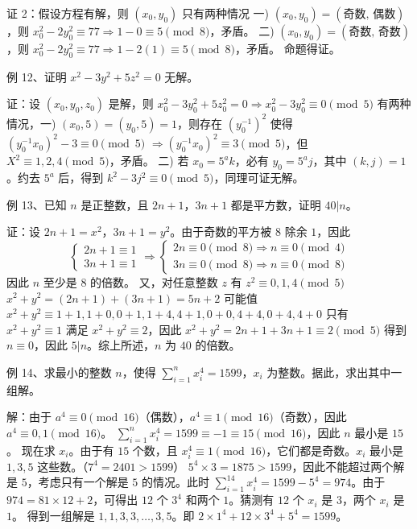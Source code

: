 \begin{questions}
\begin{solution}
证 2：假设方程有解，则 $(x_0, y_0)$ 只有两种情况
一) $(x_0, y_0) = (\text{奇数, 偶数})$，则 $x_0^2 - 2y_0^2 \equiv 77 \Rightarrow 1 - 0 \equiv 5 \pmod 8$，矛盾。
二) $(x_0, y_0) = (\text{奇数, 奇数})$，则 $x_0^2 - 2y_0^2 \equiv 77 \Rightarrow 1 - 2(1) \equiv 5 \pmod 8$，矛盾。
命题得证。
\end{solution}

\question 例 12、证明 $x^2 - 3y^2 + 5z^2 = 0$ 无解。

\begin{solution}
证：设 $(x_0, y_0, z_0)$ 是解，则 $x_0^2 - 3y_0^2 + 5z_0^2 = 0 \Rightarrow x_0^2 - 3y_0^2 \equiv 0 \pmod 5$
有两种情况，一) $(x_0, 5) = (y_0, 5) = 1$，则存在 $(y_0^{-1})^2$ 使得 $(y_0^{-1}x_0)^2 - 3 \equiv 0 \pmod 5$
$\Rightarrow (y_0^{-1}x_0)^2 \equiv 3 \pmod 5$，但 $X^2 \equiv 1, 2, 4 \pmod 5$，矛盾。
二) 若 $x_0 = 5^a k$，必有 $y_0 = 5^a j$，其中 $(k, j) = 1$。约去 $5^a$ 后，得到
$k^2 - 3j^2 \equiv 0 \pmod 5$，同理可证无解。
\end{solution}

\question 例 13、已知 $n$ 是正整数，且 $2n + 1$，$3n + 1$ 都是平方数，证明 $40 | n$。

\begin{solution}
证：设 $2n + 1 = x^2$，$3n + 1 = y^2$。由于奇数的平方被 $8$ 除余 $1$，因此
\[ \begin{cases} 2n + 1 \equiv 1 \\ 3n + 1 \equiv 1 \end{cases} \Rightarrow \begin{cases} 2n \equiv 0 \pmod 8 \Rightarrow n \equiv 0 \pmod 4 \\ 3n \equiv 0 \pmod 8 \Rightarrow n \equiv 0 \pmod 8 \end{cases} \]
因此 $n$ 至少是 $8$ 的倍数。
又，对任意整数 $z$ 有 $z^2 \equiv 0, 1, 4 \pmod 5$
$x^2 + y^2 = (2n + 1) + (3n + 1) = 5n + 2$
可能值 $x^2 + y^2 \equiv 1 + 1, 1 + 0, 0 + 1, 1 + 4, 4 + 1, 0 + 0, 4 + 4, 0 + 4, 4 + 0$
只有 $x^2 + y^2 \equiv 1 \text{ 满足 } x^2 + y^2 \equiv 2$，因此 $x^2 + y^2 = 2n + 1 + 3n + 1 \equiv 2 \pmod 5$
得到 $n \equiv 0$，因此 $5 | n$。综上所述，$n$ 为 $40$ 的倍数。
\end{solution}

\question 例 14、求最小的整数 $n$，使得 $\sum_{i=1}^{n} x_i^4 = 1599$，$x_i$ 为整数。据此，求出其中一组解。

\begin{solution}
解：由于 $a^4 \equiv 0 \pmod{16}$（偶数），$a^4 \equiv 1 \pmod{16}$（奇数），因此 $a^4 \equiv 0, 1 \pmod{16}$。
$\sum_{i=1}^n x_i^4 = 1599 \equiv -1 \equiv 15 \pmod{16}$，因此 $n$ 最小是 $15$。
现在求 $x_i$。由于有 $15$ 个数，且 $x_i^4 \equiv 1 \pmod{16}$，它们都是奇数。$x_i$ 最小是 $1, 3, 5$ 这些数。（$7^4 = 2401 > 1599$）
$5^4 \times 3 = 1875 > 1599$，因此不能超过两个解是 $5$，考虑只有一个解是 $5$ 的情况。此时 $\sum_{i=1}^{14} x_i^4 = 1599 - 5^4 = 974$。由于 $974 = 81 \times 12 + 2$，可得出 $12$ 个 $3^4$ 和两个 $1$。猜测有 $12$ 个 $x_i$ 是 $3$，两个 $x_i$ 是 $1$。
得到一组解是 $1, 1, 3, 3, \dots, 3, 5$。即 $2 \times 1^4 + 12 \times 3^4 + 5^4 = 1599$。
\end{solution}


\end{questions}
